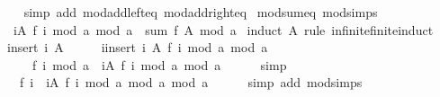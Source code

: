\begin{isabellebody}
%
\isadelimproof
\ \ %
\endisadelimproof
%
\isatagproof
{}\isamarkupfalse%
\ {\isacharparenleft}{\kern0pt}simp\ add{\isacharcolon}{\kern0pt}\ mod{\isacharunderscore}{\kern0pt}add{\isacharunderscore}{\kern0pt}left{\isacharunderscore}{\kern0pt}eq\ mod{\isacharunderscore}{\kern0pt}add{\isacharunderscore}{\kern0pt}right{\isacharunderscore}{\kern0pt}eq{\isacharparenright}{\kern0pt}%
\endisatagproof
{\isafoldproof}%
%
\isadelimproof
\isanewline
%
\endisadelimproof
\isanewline
{}\isamarkupfalse%
\ mod{\isacharunderscore}{\kern0pt}sum{\isacharunderscore}{\kern0pt}eq\ {\isacharbrackleft}{\kern0pt}mod{\isacharunderscore}{\kern0pt}simps{\isacharbrackright}{\kern0pt}{\isacharcolon}{\kern0pt}\isanewline
\ \ {\isachardoublequoteopen}{\isacharparenleft}{\kern0pt}{\isasymSum}i{\isasymin}A{\isachardot}{\kern0pt}\ f\ i\ mod\ a{\isacharparenright}{\kern0pt}\ mod\ a\ {\isacharequal}{\kern0pt}\ sum\ f\ A\ mod\ a{\isachardoublequoteclose}\isanewline
%
\isadelimproof
%
\endisadelimproof
%
\isatagproof
{}\isamarkupfalse%
\ {\isacharparenleft}{\kern0pt}induct\ A\ rule{\isacharcolon}{\kern0pt}\ infinite{\isacharunderscore}{\kern0pt}finite{\isacharunderscore}{\kern0pt}induct{\isacharparenright}{\kern0pt}\isanewline
\ \ \isamarkupfalse%
\ {\isacharparenleft}{\kern0pt}insert\ i\ A{\isacharparenright}{\kern0pt}\isanewline
\ \ \isamarkupfalse%
\ \isamarkupfalse%
\ {\isachardoublequoteopen}{\isacharparenleft}{\kern0pt}{\isasymSum}i{\isasymin}insert\ i\ A{\isachardot}{\kern0pt}\ f\ i\ mod\ a{\isacharparenright}{\kern0pt}\ mod\ a\isanewline
\ \ \ \ {\isacharequal}{\kern0pt}\ {\isacharparenleft}{\kern0pt}f\ i\ mod\ a\ {\isacharplus}{\kern0pt}\ {\isacharparenleft}{\kern0pt}{\isasymSum}i{\isasymin}A{\isachardot}{\kern0pt}\ f\ i\ mod\ a{\isacharparenright}{\kern0pt}{\isacharparenright}{\kern0pt}\ mod\ a{\isachardoublequoteclose}\isanewline
\ \ \ \ \isamarkupfalse%
\ simp\isanewline
\ \ \isamarkupfalse%
\ \isamarkupfalse%
\ {\isachardoublequoteopen}{\isasymdots}\ {\isacharequal}{\kern0pt}\ {\isacharparenleft}{\kern0pt}f\ i\ {\isacharplus}{\kern0pt}\ {\isacharparenleft}{\kern0pt}{\isasymSum}i{\isasymin}A{\isachardot}{\kern0pt}\ f\ i\ mod\ a{\isacharparenright}{\kern0pt}\ mod\ a{\isacharparenright}{\kern0pt}\ mod\ a{\isachardoublequoteclose}\isanewline
\ \ \ \ \isamarkupfalse%
\ {\isacharparenleft}{\kern0pt}simp\ add{\isacharcolon}{\kern0pt}\ mod{\isacharunderscore}{\kern0pt}simps{\isacharparenright}{\kern0pt}\isanewline
\ \ \isamarkupfalse%

\end{isabellebody}
